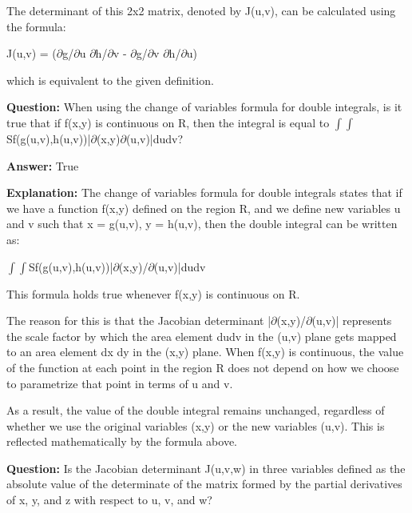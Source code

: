 \documentclass{article}
\begin{document}
The determinant of this 2x2 matrix, denoted by J(u,v), can be calculated using the formula:

J(u,v) = (\ensuremath{\partial}g/\ensuremath{\partial}u \ensuremath{\partial}h/\ensuremath{\partial}v - \ensuremath{\partial}g/\ensuremath{\partial}v \ensuremath{\partial}h/\ensuremath{\partial}u)

which is equivalent to the given definition.
                
                \vspace{0.5cm} 
        
            
                \textbf {Question:} When using the change of variables formula for double integrals, is it true that if f(x,y) is continuous on R, then the integral is equal to \ensuremath{\int}\ensuremath{\int}Sf(g(u,v),h(u,v))|\ensuremath{\partial}(x,y)\ensuremath{\partial}(u,v)|dudv?
                
                \textbf{Answer:} True

                \textbf{Explanation:} The change of variables formula for double integrals states that if we have a function f(x,y) defined on the region R, and we define new variables u and v such that x = g(u,v), y = h(u,v), then the double integral can be written as:

\ensuremath{\int}\ensuremath{\int}Sf(g(u,v),h(u,v))|\ensuremath{\partial}(x,y)/\ensuremath{\partial}(u,v)|dudv

This formula holds true whenever f(x,y) is continuous on R.

The reason for this is that the Jacobian determinant |\ensuremath{\partial}(x,y)/\ensuremath{\partial}(u,v)| represents the scale factor by which the area element dudv in the (u,v) plane gets mapped to an area element dx dy in the (x,y) plane. When f(x,y) is continuous, the value of the function at each point in the region R does not depend on how we choose to parametrize that point in terms of u and v.

As a result, the value of the double integral remains unchanged, regardless of whether we use the original variables (x,y) or the new variables (u,v). This is reflected mathematically by the formula above.
                
                \vspace{0.5cm} 
        
            
                \textbf {Question:} Is the Jacobian determinant J(u,v,w) in three variables defined as the absolute value of the determinate of the matrix formed by the partial derivatives of x, y, and z with respect to u, v, and w?
                
\end{document}
